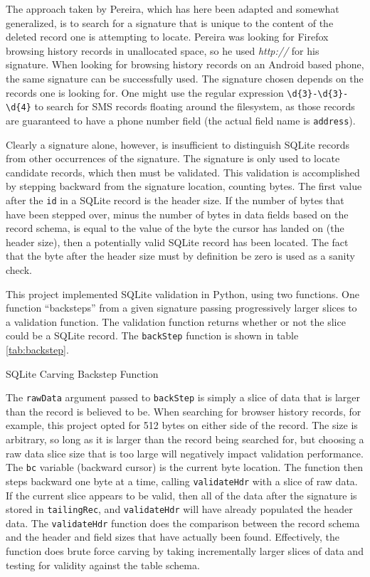 The approach taken by Pereira, which has here been adapted and somewhat generalized, is to search for a signature that is unique to
the content of the deleted record one is attempting to locate.  Pereira was looking for Firefox browsing history records in
unallocated space, so he used \emph{http://} for his signature.  When looking for browsing history records on an Android based
phone, the same signature can be successfully used.  The signature chosen depends on the records one is looking for.  One might use
the regular expression \verb|\d{3}-\d{3}-\d{4}| to search for SMS records floating around the filesystem, as those records are guaranteed
to have a phone number field (the actual field name is \texttt{address}). 

Clearly a signature alone, however, is insufficient to distinguish SQLite records from other occurrences of the signature.  The
signature is only used to locate candidate records, which then must be validated.  This validation is accomplished by stepping
backward from the signature location, counting bytes.  The first value after the \texttt{id} in a SQLite record is the header size.
If the number of bytes that have been stepped over, minus the number of bytes in data fields based on the record schema, is equal to
the value of the byte the cursor has landed on (the header size), then a potentially valid SQLite record has been located.  The fact
that the byte after the header size must by definition be zero is used as a sanity check.

This project implemented SQLite validation in Python, using two functions.  One function ``backsteps'' from a given signature
passing progressively larger slices to a validation function.  The validation function returns whether or not the slice could be a
SQLite record.  The \texttt{backStep} function is shown in table \ref{tab:backstep}. 

\begin{table}[htpb]

\caption{SQLite Carving Backstep Function}
\label{tab:backstep}
\end{table}

The \texttt{rawData} argument passed to \texttt{backStep} is simply a slice of data that is larger than the record is believed to
be.  When searching for browser history records, for example, this project opted for 512 bytes on either side of the record.  The
size is arbitrary, so long as it is larger than the record being searched for, but choosing a raw data slice size that is too large
will negatively impact validation performance.  The \texttt{bc} variable (backward cursor) is the current byte location.  The
function then steps backward one byte at a time, calling \texttt{validateHdr} with a slice of raw data.  If the current
slice appears to be valid, then all of the data after the signature is stored in \texttt{tailingRec}, and \texttt{validateHdr} will
have already populated the header data.  The \texttt{validateHdr} function does the comparison between the record schema and
the header and field sizes that have actually been found.  Effectively, the function does brute force carving by taking
incrementally larger slices of data and testing for validity against the table schema.

